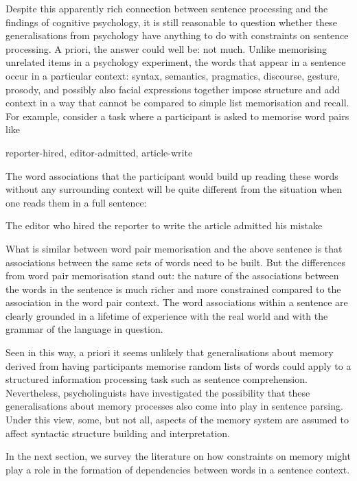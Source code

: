 \documentclass{cambridge7A}\usepackage[]{graphicx}\usepackage[]{color}
\begin{document}
Despite this apparently rich connection between sentence processing and the findings of cognitive psychology, it  is still reasonable to question whether these generalisations  from psychology have anything to do with constraints on sentence processing. A priori, the answer  could well be: not much. Unlike memorising unrelated items in a psychology experiment, the words that appear in a sentence occur in a particular context: syntax, semantics, pragmatics, discourse, gesture, prosody, and possibly also facial expressions together impose structure and add context in a way that cannot be compared to  simple list memorisation and recall.
  For example, consider  a task where a participant is asked to memorise word pairs  like
  
\begin{exe}
\ex
  reporter-hired, editor-admitted, article-write
\end{exe}

The word associations that the participant would build up reading these words without any surrounding context will be quite different from the situation when one reads them in a full sentence:
  
\begin{exe}
\ex
The editor who hired the reporter to write the article admitted his mistake
\end{exe}

What is similar between word pair memorisation and the above sentence is that associations between the same sets of words need to be built. But the differences from word pair memorisation stand out: the nature of the associations  between the words in the sentence is much richer  and more constrained compared to the association in the word pair context.  The word associations  within a sentence are clearly grounded in a lifetime of experience with the real world and  with the grammar of the language in question. 
  
Seen in this way, a priori it seems unlikely that generalisations about memory derived from having participants memorise random lists of words could apply to a structured information processing task such as sentence comprehension.  Nevertheless, psycholinguists have investigated the possibility that these generalisations about memory processes also come into play in sentence parsing.
 Under this view, some, but not all, aspects of the memory system are assumed to affect syntactic structure building  and interpretation.  
 
In the next section, we survey the literature on how constraints on memory might play a role in the formation of dependencies between words in a sentence context. 
 
\end{document}
